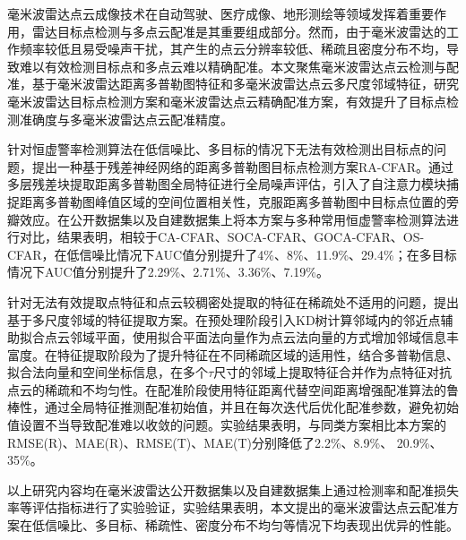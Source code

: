 

毫米波雷达点云成像技术在自动驾驶、医疗成像、地形测绘等领域发挥着重要作用，雷达目标点检测与多点云配准是其重要组成部分。然而，由于毫米波雷达的工作频率较低且易受噪声干扰，其产生的点云分辨率较低、稀疏且密度分布不均，导致难以有效检测目标点和多点云难以精确配准。本文聚焦毫米波雷达点云检测与配准，基于毫米波雷达距离多普勒图特征和多毫米波雷达点云多尺度邻域特征，研究毫米波雷达目标点检测方案和毫米波雷达点云精确配准方案，有效提升了目标点检测准确度与多毫米波雷达点云配准精度。

\par
针对恒虚警率检测算法在低信噪比、多目标的情况下无法有效检测出目标点的问题，提出一种基于残差神经网络的距离多普勒图目标点检测方案RA-CFAR。通过多层残差块提取距离多普勒图全局特征进行全局噪声评估，引入了自注意力模块捕捉距离多普勒图峰值区域的空间位置相关性，克服距离多普勒图中目标点位置的旁瓣效应。在公开数据集以及自建数据集上将本方案与多种常用恒虚警率检测算法进行对比，结果表明，相较于CA-CFAR、SOCA-CFAR、GOCA-CFAR、OS-CFAR，在低信噪比情况下AUC值分别提升了4\%、8\%、11.9\%、29.4\%；在多目标情况下AUC值分别提升了2.29\%、2.71\%、3.36\%、7.19\%。
\par
针对无法有效提取点特征和点云较稠密处提取的特征在稀疏处不适用的问题，提出基于多尺度邻域的特征提取方案。在预处理阶段引入KD树计算邻域内的邻近点辅助拟合点云邻域平面，使用拟合平面法向量作为点云法向量的方式增加邻域信息丰富度。在特征提取阶段为了提升特征在不同稀疏区域的适用性，结合多普勒信息、拟合法向量和空间坐标信息，在多个$\tau$尺寸的邻域上提取特征合并作为点特征对抗点云的稀疏和不均匀性。在配准阶段使用特征距离代替空间距离增强配准算法的鲁棒性，通过全局特征推测配准初始值，并且在每次迭代后优化配准参数，避免初始值设置不当导致配准难以收敛的问题。实验结果表明，与同类方案相比本方案的 RMSE(R)、MAE(R)、RMSE(T)、MAE(T)分别降低了2.2\%、8.9\%、 20.9\%、35\%。

以上研究内容均在毫米波雷达公开数据集以及自建数据集上通过检测率和配准损失率等评估指标进行了实验验证，实验结果表明，本文提出的毫米波雷达点云配准方案在低信噪比、多目标、稀疏性、密度分布不均匀等情况下均表现出优异的性能。